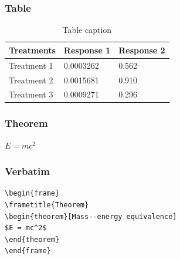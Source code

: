 \documentclass{beamer}
\begin{document}
\begin{frame}
\frametitle{Table}
\begin{table}
\begin{tabular}{l l l}
\toprule
\textbf{Treatments} & \textbf{Response 1} & \textbf{Response 2}\\
\midrule
Treatment 1 & 0.0003262 & 0.562 \\
Treatment 2 & 0.0015681 & 0.910 \\
Treatment 3 & 0.0009271 & 0.296 \\
\bottomrule
\end{tabular}
\caption{Table caption}
\end{table}
\end{frame}


\begin{frame}
\frametitle{Theorem}
\begin{theorem}
$E = mc^2$
\end{theorem}
\end{frame}


\begin{frame}[fragile] %
\frametitle{Verbatim}
\begin{example}
\begin{verbatim}
\begin{frame}
\frametitle{Theorem}
\begin{theorem}[Mass--energy equivalence]
$E = mc^2$
\end{theorem}
\end{frame}\end{verbatim}
\end{example}
\end{frame}

\end{document}
